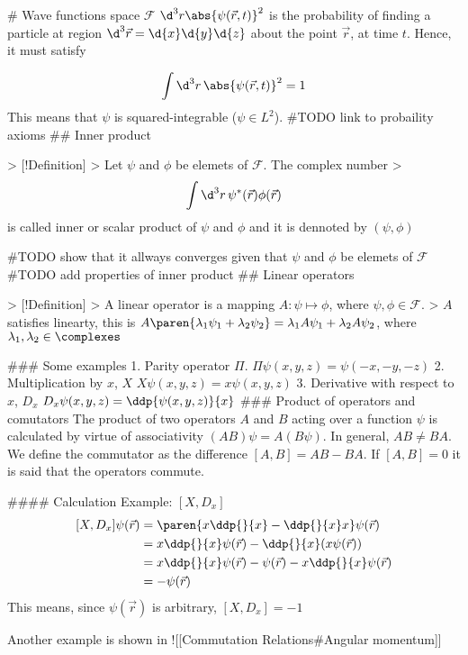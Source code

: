 # Wave functions space $\mathcal F$
$\d^3r\abs{\psi(\vec r, t)}^2$ is the probability of finding a particle at region $\d^3 \vec r = \d{x}\d{y}\d{z}$ about the point $\vec r$, at time $t$. Hence, it must satisfy

$$\int \d^3r \,  \abs{\psi(\vec r, t)}^2 = 1$$
This means that $\psi$ is squared-integrable ($\psi \in L^2$).
#TODO link to probaility axioms
## Inner product

> [!Definition]
> Let $\psi$ and $\phi$ be elemets of $\mathcal F$. The complex number 
> $$\int \d^3r \,\psi^*(\vec r)\phi(\vec r) $$ is called inner or scalar product of $\psi$ and $\phi$ and it is dennoted by $(\psi, \phi)$ 

#TODO show that it allways converges given that $\psi$ and $\phi$ be elemets of $\mathcal F$
#TODO add properties of inner product
## Linear operators

> [!Definition] 
> A linear operator is a mapping $A:\psi \mapsto \phi$, where $\psi,\phi\in\mathcal F$. 
> $A$ satisfies linearty, this is $A\paren{\lambda_{1}\psi_{1} + \lambda_{2}\psi_{2}} = \lambda_{1}A\psi_{1} + \lambda_{2}A\psi_{2}$, where $\lambda_{1},\lambda_{2}\in\complexes$

### Some examples
1. Parity operator $\Pi$.
	$\Pi \psi(x,y,z) = \psi(-x, -y, -z)$
2. Multiplication by $x$, $X$
	$X\psi(x,y,z) = x\psi(x,y,z)$
3. Derivative with respect to $x$, $D_{x}$
	$D_{x}\psi(x,y,z) = \ddp{\psi(x,y,z)}{x}$
### Product of operators and comutators
The product of two operators $A$ and $B$ acting over a function $\psi$ is calculated by virtue of associativity $(AB)\psi = A(B\psi)$. In general, $AB\neq BA$. We define the commutator as the difference $[A,B] = AB - BA$. If $[A, B] = 0$ it is said that the operators commute. 

#### Calculation Example: $[X, D_{x}]$
$$
\begin{align}
	[X,D_{x}]\psi(\vec r) &= \paren{x\ddp{}{x}-\ddp{}{x}x}\psi(\vec r) \\
	 & = x\ddp{}{x}\psi(\vec r)-\ddp{}{x}(x\psi(\vec r))  \\
	 & = x\ddp{}{x}\psi(\vec r) - \psi(\vec r) - x\ddp{}{x}\psi(\vec r) \\
	 & = -\psi(\vec r)
\end{align}
$$
This means, since $\psi(\vec r)$ is arbitrary, $[X,D_{x}] = -1$

Another example is shown in ![[Commutation Relations#Angular momentum]]
